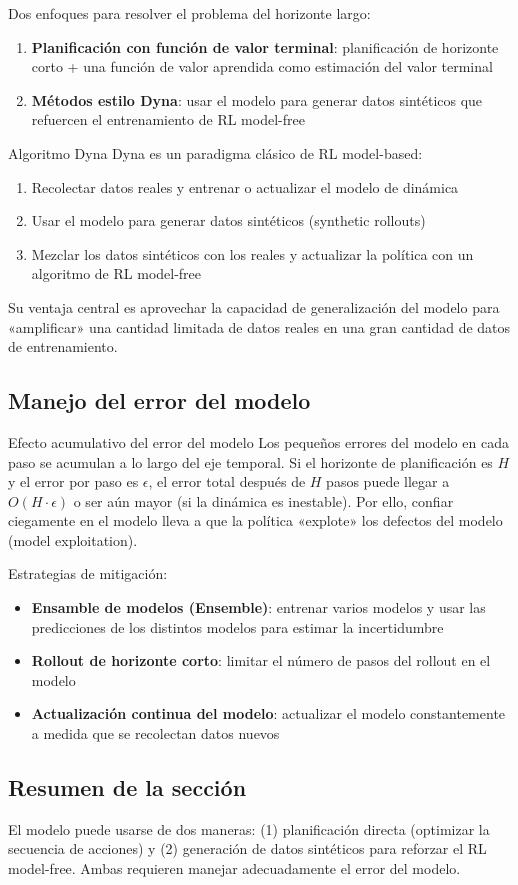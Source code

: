 Dos enfoques para resolver el problema del horizonte largo:
\begin{enumerate}
    \item \textbf{Planificación con función de valor terminal}: planificación de horizonte corto + una función de valor aprendida como estimación del valor terminal
    \item \textbf{Métodos estilo Dyna}: usar el modelo para generar datos sintéticos que refuercen el entrenamiento de RL model-free
\end{enumerate}

\begin{importantbox}{Algoritmo Dyna}
Dyna es un paradigma clásico de RL model-based:
\begin{enumerate}
    \item Recolectar datos reales y entrenar o actualizar el modelo de dinámica
    \item Usar el modelo para generar datos sintéticos (synthetic rollouts)
    \item Mezclar los datos sintéticos con los reales y actualizar la política con un algoritmo de RL model-free
\end{enumerate}
Su ventaja central es aprovechar la capacidad de generalización del modelo para «amplificar» una cantidad limitada de datos reales en una gran cantidad de datos de entrenamiento.
\end{importantbox}

\subsection{Manejo del error del modelo}

\begin{warningbox}{Efecto acumulativo del error del modelo}
Los pequeños errores del modelo en cada paso se acumulan a lo largo del eje temporal. Si el horizonte de planificación es $H$ y el error por paso es $\epsilon$, el error total después de $H$ pasos puede llegar a $O(H \cdot \epsilon)$ o ser aún mayor (si la dinámica es inestable). Por ello, confiar ciegamente en el modelo lleva a que la política «explote» los defectos del modelo (model exploitation).
\end{warningbox}

Estrategias de mitigación:
\begin{itemize}
    \item \textbf{Ensamble de modelos (Ensemble)}: entrenar varios modelos y usar las predicciones de los distintos modelos para estimar la incertidumbre
    \item \textbf{Rollout de horizonte corto}: limitar el número de pasos del rollout en el modelo
    \item \textbf{Actualización continua del modelo}: actualizar el modelo constantemente a medida que se recolectan datos nuevos
\end{itemize}

\subsection{Resumen de la sección}

El modelo puede usarse de dos maneras: (1) planificación directa (optimizar la secuencia de acciones) y (2) generación de datos sintéticos para reforzar el RL model-free. Ambas requieren manejar adecuadamente el error del modelo.
